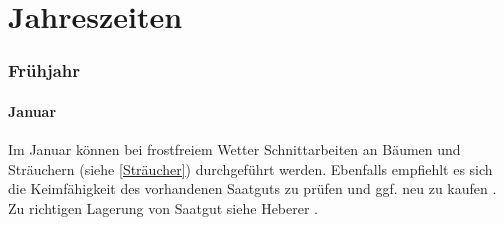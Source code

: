 \part{Jahreszeiten}

\pagebreak

\section{Frühjahr}

\subsection{Januar}

Im Januar können bei frostfreiem Wetter Schnittarbeiten an Bäumen und \textrightarrow Sträuchern (siehe \ref{Sträucher}) durchgeführt werden.
Ebenfalls empfiehlt es sich die Keimfähigkeit des vorhandenen Saatguts zu prüfen und ggf. neu zu kaufen \cite[S.~216]{Heberer2018}.
Zu richtigen Lagerung von Saatgut siehe Heberer \cite[S.~179]{Heberer2018}.

\pagebreak
